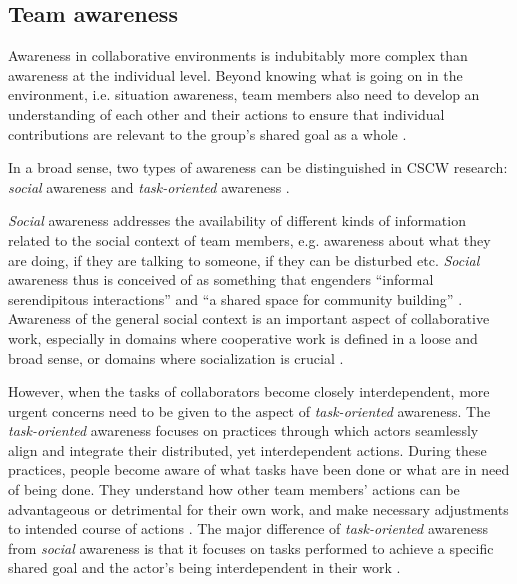 \subsection{Team awareness} %
\label{sub:team_awareness}
Awareness in collaborative environments is indubitably more complex than awareness at the individual level. Beyond knowing what is going on in the environment, i.e. situation awareness, team members also need to develop an understanding of each other and their actions to ensure that individual contributions are relevant to the group's shared goal as a whole \cite{dourish1992awareness}. 

In a broad sense, two types of awareness can be distinguished in CSCW research: \emph{social} awareness and \emph{task-oriented} awareness \cite{prinz1999a,schmidt2002a,carroll2003a}.

\emph{Social} awareness addresses the availability of different kinds of information related to the social context of team members, e.g. awareness about what they are doing, if they are talking to someone, if they can be disturbed etc. \emph{Social} awareness thus is conceived of as something that engenders ``informal serendipitous interactions'' \cite{hudson1996a} and ``a shared space for community building'' \cite{Dourish1992}. Awareness of the general social context is an important aspect of collaborative work, especially in domains where cooperative work is defined in a loose and broad sense, or domains where socialization is crucial \cite{schmidt2002a}.

However, when the tasks of collaborators become closely interdependent, more urgent concerns need to be given to the aspect of \emph{task-oriented} awareness. The \emph{task-oriented} awareness focuses on practices through which actors seamlessly align and integrate their distributed, yet interdependent actions. During these practices, people become aware of what tasks have been done or what are in need of being done. They understand how other team members' actions can be advantageous or detrimental for their own work, and make necessary adjustments to intended course of actions \cite{schmidt2002a}. The major difference of \emph{task-oriented} awareness from \emph{social} awareness is that it focuses on tasks performed to achieve a specific shared goal \cite{carroll2003a} and the actor's being interdependent in their work \cite{schmidt2002a}.

